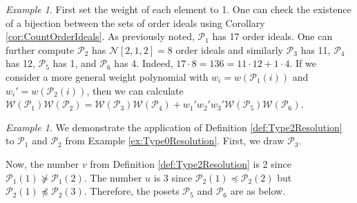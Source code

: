 \documentclass[12pt, letterpaper,table]{amsart}
\theoremstyle{remark}
\newtheorem{example}[theorem]{Example}
\newcommand{\calP}{\mathcal{P}}
\newcommand{\highlight}[1]{\colorbox{gray!15}{\small{#1}}}
\begin{document}
\begin{example}
First set the weight of each element to 1. One can check the existence of a bijection between the sets of order ideals using Corollary \ref{cor:CountOrderIdeals}. As previously noted, $\calP_1$ has 17 order ideals. One can further compute $\calP_2$ has $\mathcal{N}[2,1,2] = 8$ order ideals and similarly $\calP_3$ has 11, $\calP_4$ has 12, $\calP_5$ has 1, and $\calP_6$ has 4. Indeed, $17 \cdot 8 = 136 =  11 \cdot 12 + 1 \cdot 4$. If we consider a more general weight polynomial with $w_i = w(\calP_1(i))$ and $w_i' = w(\calP_2(i))$, then we can calculate $\mathcal{W}(\calP_1) \mathcal{W}(\calP_2) = \mathcal{W}(\calP_3) \mathcal{W}(\calP_4) + w_1'w_2'w_3' \mathcal{W}(\calP_5) \mathcal{W}(\calP_6)$.
\end{example}

\begin{example}\label{ex:Type2Resolution}
We demonstrate the application of  Definition \ref{def:Type2Resolution} to $\calP_1$ and $\calP_2$ from Example \ref{ex:Type0Resolution}. First, we draw $\calP_3$.

\begin{center}
\end{center}

Now, the number $v$ from Definition \ref{def:Type2Resolution} is 2 since $\calP_1(1) \not \succeq  \calP_1(2)$. The number $u$ is $3$ since $\calP_2(1) \preceq \calP_2(2)$ but $\calP_2(1) \not\preceq  \calP_2(3)$. Therefore, the posets $\calP_5$ and $\calP_6$ are as below.

\begin{center}
\end{center}


\end{example}
\end{document}
